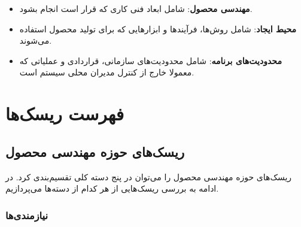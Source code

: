 \begin{itemize}
	\item
	\textbf{مهندسی محصول}:
	 شامل ابعاد فنی کاری که قرار است انجام بشود.
	
	\item
	\textbf{محیط ایجاد}:
	 شامل روش‌ها، فرآیندها و ابزارهایی که برای تولید محصول استفاده می‌شوند.
	
	\item
	\textbf{محدودیت‌های برنامه}:
	 شامل محدودیت‌های سازمانی، قراردادی و عملیاتی که معمولا خارج از کنترل مدیران محلی سیستم است.
\end{itemize}

\section{فهرست ریسک‌ها}

\subsection{ریسک‌های حوزه مهندسی محصول}

ریسک‌های حوزه مهندسی محصول را می‌توان در پنج دسته کلی تقسیم‌بندی کرد. در ادامه به بررسی ریسک‌هایی از هر کدام از دسته‌ها می‌پردازیم.


\subsubsection{نیازمندی‌ها}

